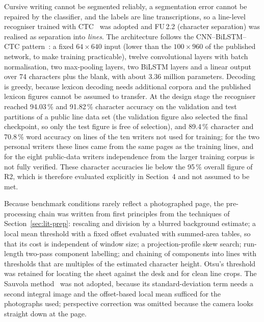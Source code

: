 Cursive writing cannot be segmented reliably, a segmentation error cannot be repaired by the classifier, and the labels are line transcriptions, so a line-level recogniser trained with CTC~\cite{graves2006} was adopted and FU\,2.2 (character separation) was realised as separation into \emph{lines}. The architecture follows the CNN--BiLSTM--CTC pattern~\cite{shi2017,puigcerver2017,kizilirmak2023}: a fixed $64\times640$ input (lower than the $100\times960$ of the published network, to make training practicable), twelve convolutional layers with batch normalisation, two max-pooling layers, two BiLSTM layers and a linear output over 74 characters plus the blank, with about 3.36 million parameters. Decoding is greedy, because lexicon decoding needs additional corpora and the published lexicon figures cannot be assumed to transfer. At the design stage the recogniser reached 94.03\,\% and 91.82\,\% character accuracy on the validation and test partitions of a public line data set (the validation figure also selected the final checkpoint, so only the test figure is free of selection), and 89.4\,\% character and 70.8\,\% word accuracy on lines of the ten writers not used for training; for the two personal writers these lines came from the same pages as the training lines, and for the eight public-data writers independence from the larger training corpus is not fully verified. These character accuracies lie below the 95\,\% overall figure of R2, which is therefore evaluated explicitly in Section~4 and not assumed to be met.

Because benchmark conditions rarely reflect a photographed page, the pre-processing chain was written from first principles from the techniques of Section~\ref{sec:lit-prep}: rescaling and division by a blurred background estimate; a local mean threshold with a fixed offset evaluated with summed-area tables, so that its cost is independent of window size; a projection-profile skew search; run-length two-pass component labelling; and chaining of components into lines with thresholds that are multiples of the estimated character height. Otsu's threshold~\cite{otsu1979} was retained for locating the sheet against the desk and for clean line crops. The Sauvola method~\cite{sauvola2000} was not adopted, because its standard-deviation term needs a second integral image and the offset-based local mean sufficed for the photographs used; perspective correction was omitted because the camera looks straight down at the page.

